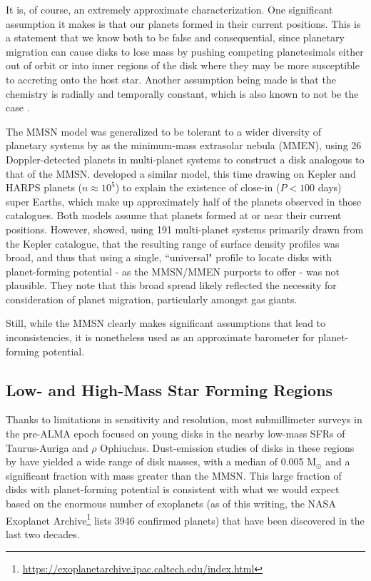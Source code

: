 It is, of course, an extremely approximate characterization. One significant assumption it makes is that our planets formed in their current positions. This is a statement that we know both to be false \citep{Tsiganis2005,Walsh2011} and consequential, since planetary migration can cause disks to lose mass by pushing competing planetesimals either out of orbit or into inner regions of the disk where they may be more susceptible to accreting onto the host star. Another assumption being made is that the chemistry is radially and temporally constant, which is also known to not be the case \citep{vanDishoeckBlake1998}.

The MMSN model was generalized to be tolerant to a wider diversity of planetary systems by \citet{Kuchner2004} as the minimum-mass extrasolar nebula (MMEN), using 26 Doppler-detected planets in multi-planet systems to construct a disk analogous to that of the MMSN. \citet{ChiangLaughlin2013} developed a similar model, this time drawing on Kepler and HARPS planets ($n \approx 10^5$) to explain the existence of close-in ($P < 100$ days) super Earths, which make up approximately half of the planets observed in those catalogues. Both models assume that planets formed at or near their current positions. However, \citet{Raymond2014} showed, using 191 multi-planet systems primarily drawn from the Kepler catalogue, that the resulting range of surface density profiles was broad, and thus that using a single, ``universal" profile to locate disks with planet-forming potential - as the MMSN/MMEN purports to offer - was not plausible. They note that this broad spread likely reflected the necessity for consideration of planet migration, particularly amongst gas giants.

Still, while the MMSN clearly makes significant assumptions that lead to inconsistencies, it is nonetheless used as an approximate barometer for planet-forming potential.




\subsection{Low- and High-Mass Star Forming Regions}
Thanks to limitations in sensitivity and resolution, most submillimeter surveys in the pre-ALMA epoch focused on young disks in the nearby low-mass SFRs of Taurus-Auriga and $\rho$ Ophiuchus. Dust-emission studies of disks in these regions by \citet{AndrewsWilliams2005,AndrewsWilliams2007} have yielded a wide range of disk masses, with a median of 0.005 M$_{\odot}$ and a significant fraction with mass greater than the MMSN. This large fraction of disks with planet-forming potential is consistent with what we would expect based on the enormous number of exoplanets (as of this writing, the NASA Exoplanet Archive\footnote{\url{https://exoplanetarchive.ipac.caltech.edu/index.html}} lists 3946 confirmed planets)  that have been discovered in the last two decades.


